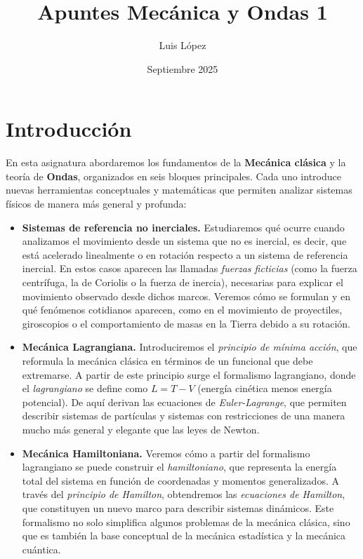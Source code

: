 \documentclass[a4paper,12pt]{article}
\title{Apuntes Mecánica y Ondas 1}
\author{Luis López}
\date{Septiembre 2025}
\begin{document}
\maketitle
\newpage
\tableofcontents
\newpage

\section*{Introducción}

En esta asignatura abordaremos los fundamentos de la \textbf{Mecánica clásica} y la teoría de \textbf{Ondas}, organizados en seis bloques principales. Cada uno introduce nuevas herramientas conceptuales y matemáticas que permiten analizar sistemas físicos de manera más general y profunda:

\begin{itemize}
    \item \textbf{Sistemas de referencia no inerciales.} 
    Estudiaremos qué ocurre cuando analizamos el movimiento desde un sistema que no es inercial, es decir, que está acelerado linealmente o en rotación respecto a un sistema de referencia inercial. En estos casos aparecen las llamadas \emph{fuerzas ficticias} (como la fuerza centrífuga, la de Coriolis o la fuerza de inercia), necesarias para explicar el movimiento observado desde dichos marcos. Veremos cómo se formulan y en qué fenómenos cotidianos aparecen, como en el movimiento de proyectiles, giroscopios o el comportamiento de masas en la Tierra debido a su rotación.

    \item \textbf{Mecánica Lagrangiana.} 
    Introduciremos el \emph{principio de mínima acción}, que reformula la mecánica clásica en términos de un funcional que debe extremarse. A partir de este principio surge el formalismo lagrangiano, donde el \emph{lagrangiano} se define como \(L = T - V\) (energía cinética menos energía potencial). De aquí derivan las ecuaciones de \emph{Euler-Lagrange}, que permiten describir sistemas de partículas y sistemas con restricciones de una manera mucho más general y elegante que las leyes de Newton.

    \item \textbf{Mecánica Hamiltoniana.} 
    Veremos cómo a partir del formalismo lagrangiano se puede construir el \emph{hamiltoniano}, que representa la energía total del sistema en función de coordenadas y momentos generalizados. A través del \emph{principio de Hamilton}, obtendremos las \emph{ecuaciones de Hamilton}, que constituyen un nuevo marco para describir sistemas dinámicos. Este formalismo no solo simplifica algunos problemas de la mecánica clásica, sino que es también la base conceptual de la mecánica estadística y la mecánica cuántica.


\end{itemize}
\end{document}
